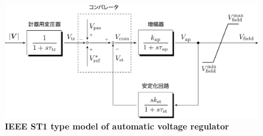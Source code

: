 \documentclass[graybox, envcountchap]{svmult}
\begin{document}
%

\begin{figure}[t]
\centering
\includegraphics[width = .85\linewidth]{figs/avrst1}
\medskip
\caption{\textbf{IEEE ST1 type model of automatic voltage regulator}}
\label{fig:avrst1}
\medskip
\end{figure}
\end{document}
